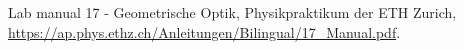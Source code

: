 
\begin{thebibliography}{99}




Lab manual 17 - Geometrische Optik, Physikpraktikum der ETH Zurich,  \url{https://ap.phys.ethz.ch/Anleitungen/Bilingual/17_Manual.pdf}.
\end{thebibliography}

